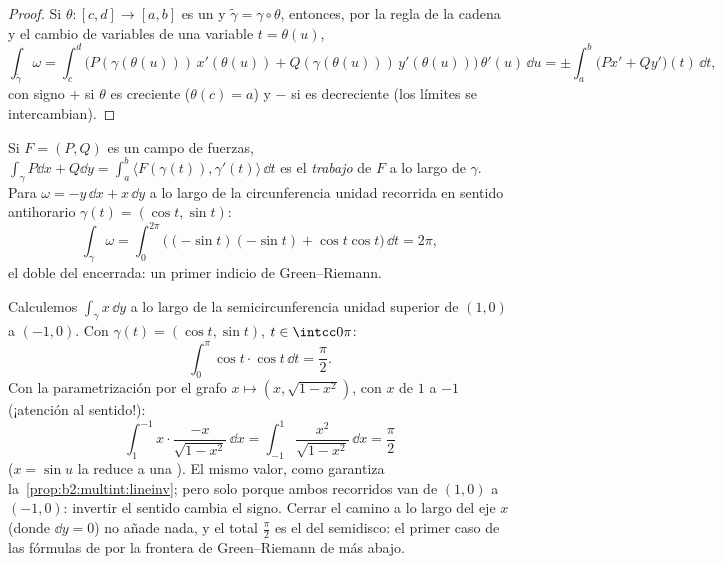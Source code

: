 \begin{proof}
Si $\theta \colon [c, d] \to [a, b]$ es un  y
$\tilde\gamma = \gamma \circ \theta$, entonces, por la regla de la
cadena y el cambio de variables de una variable $t = \theta(u)$,
\[
\int_{\tilde\gamma}\omega
= \int_c^d \bigl(P(\gamma(\theta(u)))\,x'(\theta(u))
+ Q(\gamma(\theta(u)))\,y'(\theta(u))\bigr)\,\theta'(u)\,\dd u
= \pm\int_a^b \bigl(Px' + Qy'\bigr)(t)\,\dd t ,
\]
con signo $+$ si $\theta$ es creciente ($\theta(c) = a$) y $-$ si es
decreciente (los límites se intercambian).
\end{proof}

\begin{example}\label{ex:b2:multint:work}
Si $F = (P, Q)$ es un campo de fuerzas, $\int_\gamma P\dd x + Q\dd y
= \int_a^b \langle F(\gamma(t)), \gamma'(t)\rangle\,\dd t$ es el
\emph{trabajo} de $F$ a lo largo de $\gamma$. Para $\omega = -y\,\dd
x + x\,\dd y$ a lo largo de la circunferencia unidad recorrida en
sentido antihorario $\gamma(t) = (\cos t, \sin t)$:
\[
\int_\gamma \omega
= \int_0^{2\pi}\bigl((-\sin t)(-\sin t)
+ \cos t\cos t\bigr)\,\dd t = 2\pi ,
\]
el doble del  encerrada: un primer indicio de Green--Riemann.
\end{example}

\begin{example}\label{ex:b2:multint:semicircle}
Calculemos $\int_\gamma x\,\dd y$ a lo largo de la semicircunferencia
unidad superior de $(1, 0)$ a $(-1, 0)$. Con $\gamma(t) = (\cos t,
\sin t)$, $t \in \intcc0\pi$:
\[
\int_0^\pi\cos t\cdot\cos t\,\dd t = \frac\pi2 .
\]
Con la parametrización por el grafo $x \mapsto (x, \sqrt{1 - x^2})$,
con $x$ de $1$ a $-1$ (¡atención al sentido!):
\[
\int_1^{-1}x\cdot\frac{-x}{\sqrt{1 - x^2}}\,\dd x
= \int_{-1}^{1}\frac{x^2}{\sqrt{1 - x^2}}\,\dd x
= \frac\pi2
\]
($x = \sin u$ la reduce a una ). El mismo valor,
como garantiza la~\cref{prop:b2:multint:lineinv}; pero solo porque
ambos recorridos van de $(1,0)$ a $(-1,0)$: invertir el sentido
cambia el signo. Cerrar el camino a lo largo del eje $x$ (donde $\dd
y = 0$) no añade nada, y el total $\frac\pi2$ es el  del
semidisco: el primer caso de las fórmulas de
 por la frontera de Green--Riemann de más abajo.
\end{example}

